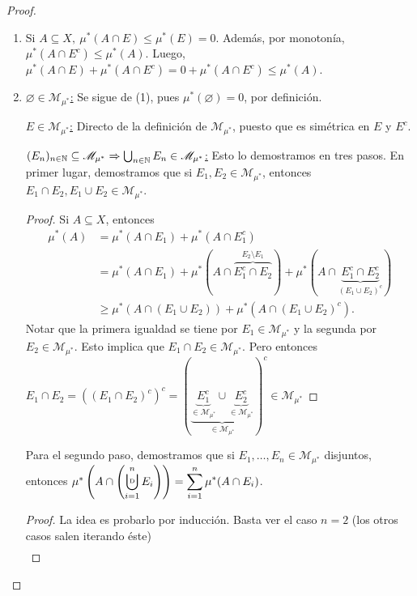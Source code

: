 \begin{proof}~
	\begin{enumerate}
		\item Si $A \subseteq X,\ \mu^{*}(A \cap E) \leq \mu^{*}(E) = 0$. Además, por monotonía, $\mu^{*}(A \cap E^c) \leq \mu^{*}(A)$. Luego, $\mu^{*}(A \cap E) + \mu^{*}(A \cap E^c) = 0 + \mu^{*}(A \cap E^c) \leq \mu^{*}(A)$.

		\item \underline{$\varnothing \in \mathscr{M}_{\mu^{*}}$:} Se sigue de (1), pues $\mu^{*}(\varnothing) = 0$, por definición.

		\underline{$E \in \mathscr{M}_{\mu^{*}}$:} Directo de la definición de $\mathscr{M}_{\mu^{*}}$, puesto que es simétrica en $E$ y $E^c$.

		\underline{$(E_n)_{n\in\mathbb{N}} \subseteq \mathscr{M}_{\mu^{*}} \Rightarrow \bigcup_{n\in\mathbb{N}} E_n \in \mathscr{M}_{\mu^{*}}$:} Esto lo demostramos en tres pasos. En primer lugar, demostramos que si $E_1,E_2 \in \mathscr{M}_{\mu^{*}}$, entonces $E_1 \cap E_2, E_1 \cup E_2 \in \mathscr{M}_{\mu^{*}}$.
		\begin{proof}
			Si $A \subseteq X$, entonces
			\begin{align*}
				\mu^{*}(A) & = \mu^{*}(A \cap E_1) + \mu^{*}(A \cap E_1^c) \\
				& = \mu^{*}(A \cap E_1) + \mu^{*}(A \cap \overbrace{E_1^c \cap E_2}^{E_2 \setminus E_1}) + \mu^{*}(A \cap \underbrace{E_1^c \cap E_2^c}_{(E_1 \cup E_2)^c}) \\
				& \geq \mu^{*}(A \cap (E_1 \cup E_2)) + \mu^{*}(A \cap (E_1 \cup E_2)^c) 
			.\end{align*}
			Notar que la primera igualdad se tiene por $E_1 \in \mathscr{M}_{\mu^{*}}$ y la segunda por $E_2 \in \mathscr{M}_{\mu^{*}}$. Esto implica que $E_1 \cap E_2 \in \mathscr{M}_{\mu^{*}}$. Pero entonces $E_1 \cap E_2 = ((E_1 \cap E_2)^c)^c = (\underbrace{\underbrace{E_{1}^c}_{\in \mathscr{M}_{\mu^{*}}} \cup \underbrace{E_{2}^c}_{\in \mathscr{M}_{\mu^{*}}}}_{\in \mathscr{M}_{\mu^{*}}})^c \in \mathscr{M}_{\mu^{*}}$
		\end{proof}
		Para el segundo paso, demostramos que si $E_1,\dots,E_n \in \mathscr{M}_{\mu^{*}}$ disjuntos, entonces $\mu^{*}\left(A \cap \left(\displaystyle\bigcupd_{i=1}^{n} E_i \right)\right) = \displaystyle\sum_{i=1}^{n} \mu^{*}(A \cap E_i)$.
		\begin{proof}
			La idea es probarlo por inducción. Basta ver el caso $n=2$ (los otros casos salen iterando éste)
			\begin{align*}

\end{align*}
\end{proof}
\end{enumerate}
\end{proof}

